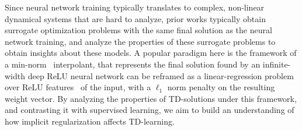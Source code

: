 

Since neural network training typically translates to complex, non-linear dynamical systems that are hard to analyze, prior works typically obtain surrogate optimization problems with the same final solution as the neural network training, and analyze the properties of these surrogate problems to obtain insights about these models. A popular paradigm here is the framework of a min-norm~\citep{hastie2019surprises} interpolant, that represents the final solution found by an infinite-width deep ReLU neural network can be reframed as a linear-regression problem over ReLU features~\citep{wei2019regularization,savarese2019infinite} of the input, with a $\ell_1$ norm penalty on the resulting weight vector. By analyzing the properties of TD-solutions under this framework, and contrasting it with supervised learning, we aim to build an understanding of how implicit regularization affects TD-learning.

